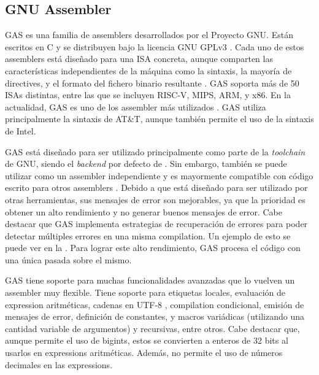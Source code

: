 \subsection{GNU Assembler}

\gls{GAS} \parencite{GNUas} es una familia de \glspl{assembler} desarrollados
por el Proyecto GNU. Están escritos en C y se distribuyen bajo la licencia GNU
GPLv3 \parencite{gpl}. Cada uno de estos \glspl{assembler} está diseñado para
una \gls{ISA} concreta, aunque comparten las características independientes de
la máquina como la sintaxis, la mayoría de \glspl{directive}, y el formato del
fichero binario resultante \parencite{as-manual}. \gls{GAS} soporta más de 50
\glspl{ISA} distintas, entre las que se incluyen RISC-V, MIPS, ARM, y x86. En la
actualidad, \gls{GAS} es uno de los \gls{assembler} más utilizados
\parencite{assembler-usage}. \gls{GAS} utiliza principalmente la sintaxis de
AT\&T, aunque también permite el uso de la sintaxis de Intel.

\gls{GAS} está diseñado para ser utilizado principalmente como parte de la
\textit{\gls{toolchain}} de GNU, siendo el \textit{backend} por defecto de
. Sin embargo, también se puede utilizar como un \gls{assembler}
independiente y es mayormente compatible con código escrito para otros
\glspl{assembler} \parencite{as-manual}. Debido a que está diseñado para ser
utilizado por otras herramientas, sus mensajes de error son mejorables, ya que
la prioridad es obtener un alto rendimiento y no generar buenos mensajes de
error. Cabe destacar que \gls{GAS} implementa estrategias de recuperación de
errores para poder detectar múltiples errores en una misma \gls{compilation}. Un
ejemplo de esto se puede ver en la . Para lograr este alto
rendimiento, \gls{GAS} procesa el código con una única pasada sobre el mismo.


\gls{GAS} tiene soporte para muchas funcionalidades avanzadas que lo vuelven un
\gls{assembler} muy flexible. Tiene soporte para etiquetas locales, evaluación
de \gls{expression} aritméticas, cadenas en UTF-8 \parencite{UTF-8},
\gls{compilation} condicional, emisión de mensajes de error, definición de
constantes, y \glspl{macro} variádicas (utilizando una cantidad variable de
argumentos) y recursivas, entre otros. Cabe destacar que, aunque permite el uso
de \glspl{bigint}, estos se convierten a enteros de 32 bits al usarlos en
\glspl{expression} aritméticas. Además, no permite el uso de números decimales
en las \glspl{expression}.

